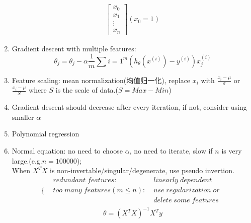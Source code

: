 \documentclass[UTF8]{ctexart}
\begin{document}
\begin{enumerate}
\[\begin{aligned}
                  \begin{bmatrix}
                      x_0    \\
                      x_1    \\
                      \vdots \\
                      x_n
                  \end{bmatrix}
                  (x_0 = 1)
              \end{aligned}
          \]
    \item Gradient descent with multiple features:
          \[
              \theta_j = \theta_j - \alpha \frac{1}{m} \sum{i=1}^{m} (h_\theta(x^{(i)}) - y^{(i)}) x_j^{(i)}
          \]
    \item Feature scaling: mean normalization(均值归一化), replace $x_i$ with $\frac{x_i-\mu}{\sigma}$ or $\frac{x_i-\mu}{S}$ where $S$ is the scale of data.($S = Max - Min$)
    \item Gradient descent should decrease after every iteration, if not, consider using smaller $\alpha$
    \item Polynomial regression
    \item Normal equation:
          no need to choose $\alpha$, no need to iterate, slow if $n$ is very large.(e.g.$n = 100000$); \\
          When $X^{T}X$ is non-invertable/singular/degenerate, use pseudo invertion.
          \[
              \Bigg\{
              \begin{aligned}
                   & redundant\; features:\;            & linearly\; dependent        \\
                   & too\; many\; features(m \leq n):\; & use\; regularization\; or\; \\
                   &                                    & delete\; some\; features\;  \\
              \end{aligned}
          \]
          \[
              \theta = (X^{T}X)^{-1}X^{T}y
          \]
\end{enumerate}
\end{document}
